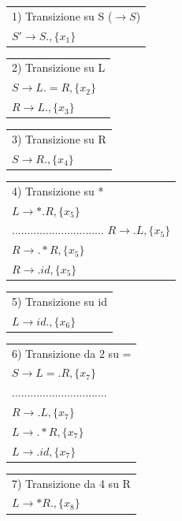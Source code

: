 \begin{tabular}{l}
	1) Transizione su S ($\rightarrow S$)\\
	$S' \rightarrow S.,\{ x_1 \}$\\
\end{tabular}

\begin{tabular}{l}
	2) Transizione su L\\
	$S \rightarrow L.=R, \{ x_2 \}$\\
	$R \rightarrow L., \{ x_3 \}$\\
\end{tabular}

\begin{tabular}{l}
	3) Transizione su R\\
	$S \rightarrow R., \{ x_4 \}$\\
\end{tabular}

\begin{tabular}{l}
	4) Transizione su *\\
	$L \rightarrow *.R, \{ x_5 \}$\\
	..............................
	$R \rightarrow .L, \{ x_5 \}$\\
	$R \rightarrow .*R, \{ x_5 \}$\\
	$R \rightarrow .id, \{ x_5 \}$\\
\end{tabular}

\begin{tabular}{l}
	5) Transizione su id\\
	$L \rightarrow id., \{ x_6 \}$\\
\end{tabular}

\begin{tabular}{l}
	6) Transizione da 2 su =\\
	$S \rightarrow L=.R, \{ x_7 \}$\\
	...............................\\
	$R \rightarrow .L, \{ x_7 \}$\\
	$L \rightarrow .*R, \{ x_7 \}$\\
	$L \rightarrow .id, \{ x_7 \}$\\
\end{tabular}

\begin{tabular}{l}
	7) Transizione da 4 su R\\
	$L \rightarrow *R., \{ x_8 \}$\\
\end{tabular}

